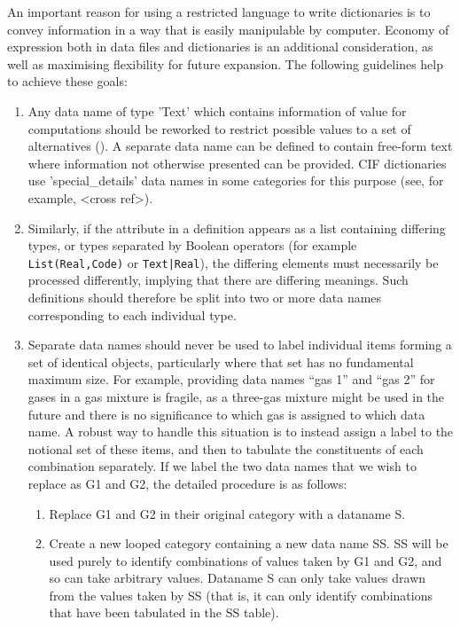 An important reason for using a restricted language to write dictionaries
is to convey information in a way that is easily manipulable by computer.
Economy of expression both in data files and dictionaries is an additional
consideration, as well as maximising flexibility for future expansion.
The following guidelines help to achieve these goals:
\begin{enumerate}
\item Any data name of type 'Text' which contains information of value for
computations should be reworked to restrict possible values to a set
of alternatives (). A separate data name
can be defined to contain free-form text where information not otherwise
presented can be provided. CIF dictionaries use 'special\_details'
data names in some categories for this purpose (see, for example,
<cross ref>). 
\item Similarly, if the  attribute in a definition
appears as a list containing differing types, or types separated by
Boolean operators (for example \texttt{List(Real,Code)} or \texttt{Text|Real}),
the differing elements must necessarily be processed differently,
implying that there are differing meanings. Such definitions should
therefore be split into two or more data names corresponding to each
individual type.
\item Separate data names should never be used to label individual items
forming a set of identical objects, particularly where that set has
no fundamental maximum size. For example, providing data names ``gas
1'' and ``gas 2'' for gases in a gas mixture is fragile, as a three-gas
mixture might be used in the future and there is no significance to
which gas is assigned to which data name. A robust way to handle this
situation is to instead assign a label to the notional set of these
items, and then to tabulate the constituents of each combination separately.
If we label the two data names that we wish to replace as G1 and G2,
the detailed procedure is as follows:
\begin{enumerate}
\item Replace G1 and G2 in their original category with a dataname S. 
\item Create a new looped category containing a new data name SS. SS will
be used purely to identify combinations of values taken by G1 and
G2, and so can take arbitrary values. Dataname S can only take values
drawn from the values taken by SS (that is, it can only identify combinations
that have been tabulated in the SS table).

\end{enumerate}
\end{enumerate}
